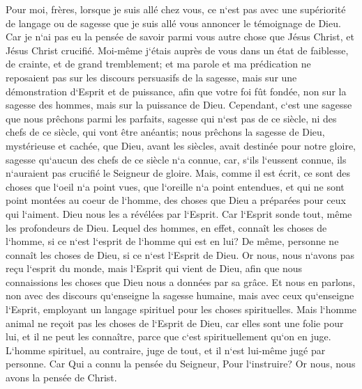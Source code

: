 \verse Pour moi, frères, lorsque je suis allé chez vous, ce n`est pas avec une supériorité de langage ou de sagesse que je suis allé vous annoncer le témoignage de Dieu. 
\verse Car je n`ai pas eu la pensée de savoir parmi vous autre chose que Jésus Christ, et Jésus Christ crucifié. 
\verse Moi-même j`étais auprès de vous dans un état de faiblesse, de crainte, et de grand tremblement; 
\verse et ma parole et ma prédication ne reposaient pas sur les discours persuasifs de la sagesse, mais sur une démonstration d`Esprit et de puissance, 
\verse afin que votre foi fût fondée, non sur la sagesse des hommes, mais sur la puissance de Dieu. 
\verse Cependant, c`est une sagesse que nous prêchons parmi les parfaits, sagesse qui n`est pas de ce siècle, ni des chefs de ce siècle, qui vont être anéantis; 
\verse nous prêchons la sagesse de Dieu, mystérieuse et cachée, que Dieu, avant les siècles, avait destinée pour notre gloire, 
\verse sagesse qu`aucun des chefs de ce siècle n`a connue, car, s`ils l`eussent connue, ils n`auraient pas crucifié le Seigneur de gloire. 
\verse Mais, comme il est écrit, ce sont des choses que l`oeil n`a point vues, que l`oreille n`a point entendues, et qui ne sont point montées au coeur de l`homme, des choses que Dieu a préparées pour ceux qui l`aiment. 
\verse Dieu nous les a révélées par l`Esprit. Car l`Esprit sonde tout, même les profondeurs de Dieu. 
\verse Lequel des hommes, en effet, connaît les choses de l`homme, si ce n`est l`esprit de l`homme qui est en lui? De même, personne ne connaît les choses de Dieu, si ce n`est l`Esprit de Dieu. 
\verse Or nous, nous n`avons pas reçu l`esprit du monde, mais l`Esprit qui vient de Dieu, afin que nous connaissions les choses que Dieu nous a données par sa grâce. 
\verse Et nous en parlons, non avec des discours qu`enseigne la sagesse humaine, mais avec ceux qu`enseigne l`Esprit, employant un langage spirituel pour les choses spirituelles. 
\verse Mais l`homme animal ne reçoit pas les choses de l`Esprit de Dieu, car elles sont une folie pour lui, et il ne peut les connaître, parce que c`est spirituellement qu`on en juge. 
\verse L`homme spirituel, au contraire, juge de tout, et il n`est lui-même jugé par personne. 
\verse Car Qui a connu la pensée du Seigneur, Pour l`instruire? Or nous, nous avons la pensée de Christ. 

\chapter{}

